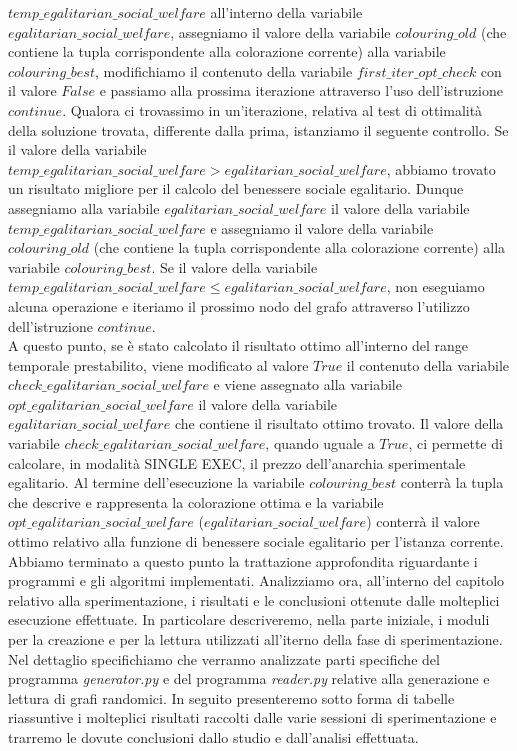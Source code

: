 $temp\_egalitarian\_social\_welfare$ all'interno della variabile \\
$egalitarian\_social\_welfare$, assegniamo il valore della variabile $colouring\_old$ (che contiene la tupla corrispondente alla colorazione corrente) alla variabile $colouring\_best$, modifichiamo il contenuto della variabile $first\_iter\_opt\_check$ con il valore $False$ e passiamo alla prossima iterazione attraverso l'uso dell'istruzione $continue$. Qualora ci trovassimo in un'iterazione, relativa al test di ottimalità della soluzione trovata, differente dalla prima, istanziamo il seguente controllo. Se il valore della variabile \\
$temp\_egalitarian\_social\_welfare > egalitarian\_social\_welfare$, abbiamo trovato un risultato migliore per il calcolo del benessere sociale egalitario. Dunque assegniamo alla variabile $egalitarian\_social\_welfare$ il valore della variabile $temp\_egalitarian\_social\_welfare$ e assegniamo il valore della variabile $colouring\_old$ (che contiene la tupla corrispondente alla colorazione corrente) alla variabile $colouring\_best$. Se il valore della variabile \\
$temp\_egalitarian\_social\_welfare \leq egalitarian\_social\_welfare$, non eseguiamo alcuna operazione e iteriamo il prossimo nodo del grafo attraverso l'utilizzo dell'istruzione $continue$.\\
A questo punto, se è stato calcolato il risultato ottimo all'interno del range temporale prestabilito, viene modificato al valore $True$ il contenuto della variabile $check\_egalitarian\_social\_welfare$ e viene assegnato alla variabile $opt\_egalitarian\_social\_welfare$ il valore della variabile \\
$egalitarian\_social\_welfare$ che contiene il risultato ottimo trovato. Il valore della variabile $check\_egalitarian\_social\_welfare$, quando uguale a $True$, ci permette di calcolare, in modalità SINGLE EXEC, il prezzo dell'anarchia sperimentale egalitario. Al termine dell'esecuzione la variabile $colouring\_best$ conterrà la tupla che descrive e rappresenta la colorazione ottima e la variabile \\
$opt\_egalitarian\_social\_welfare$ ($egalitarian\_social\_welfare$) conterrà il valore ottimo relativo alla funzione di benessere sociale egalitario per l'istanza corrente.\\

Abbiamo terminato a questo punto la trattazione approfondita riguardante i programmi e gli algoritmi implementati. Analizziamo ora, all'interno del capitolo relativo alla sperimentazione, i risultati e le conclusioni ottenute dalle molteplici esecuzione effettuate. In particolare descriveremo, nella parte iniziale, i moduli per la creazione e per la lettura utilizzati all'iterno della fase di sperimentazione. Nel dettaglio specifichiamo che verranno analizzate parti specifiche del programma \textit{generator.py} e del programma \textit{reader.py} relative alla generazione e lettura di grafi randomici. In seguito presenteremo sotto forma di tabelle riassuntive i molteplici risultati raccolti dalle varie sessioni di sperimentazione e trarremo le dovute conclusioni dallo studio e dall'analisi effettuata.